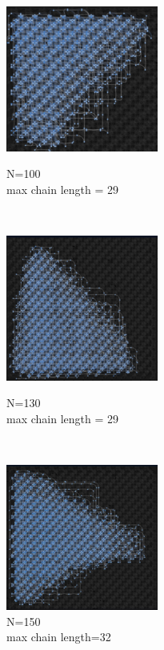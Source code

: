 \documentclass[oneside,a4paper]{article}
\begin{document}
\begin{figure}[htp]
\begin{minipage}[b]{4.5cm}
\centering
\includegraphics[width=5cm]{LaTeXTemplate/Images/Advantagefirst100.png}
\caption{N=100\\max chain length = 29}
\end{minipage}
\ \hspace{2mm} \hspace{2mm} \
\begin{minipage}[b]{4.5cm}
\centering
\includegraphics[width=5cm]{LaTeXTemplate/Images/Advantagefirst130.png}
\caption{N=130\\max chain length = 29}
\end{minipage}
\ \hspace{2mm} \hspace{2mm} \
\begin{minipage}[b]{4.5cm}
\centering
\includegraphics[width=5cm]{LaTeXTemplate/Images/Advantagefirst150.png}
\caption{N=150\\max chain length=32}
\end{minipage}
\end{figure}
\end{document}
